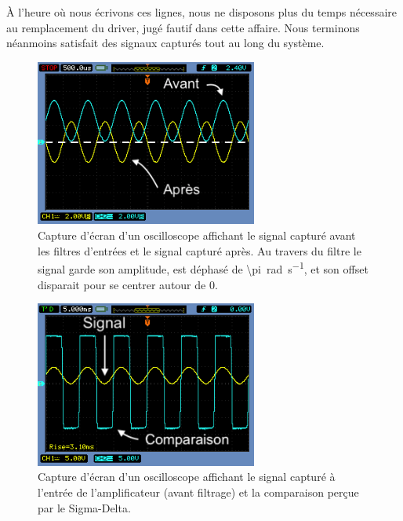 \documentclass[10pt, oneside, a4paper]{article}
\begin{document}
À l'heure où nous écrivons ces lignes, nous ne disposons plus du temps nécessaire au remplacement du driver, jugé fautif dans cette affaire.
Nous terminons néanmoins satisfait des signaux capturés tout au long du système.


\pagebreak
\begin{figure}[p]
	\centering
	\includegraphics[width=0.65\textwidth]{image/osci-post-filters.png}
	\caption{Capture d'écran d'un oscilloscope affichant le signal capturé avant les
			 filtres d'entrées et le signal capturé après.
			 Au travers du filtre le signal garde son amplitude, est déphasé de
			 \SI{\pi}{\radian\per\second}, et son offset disparait pour se centrer autour
			 de 0.}
	\label{fig:osci-post-filters}
\end{figure}

\begin{figure}[p]
	\centering
	\includegraphics[width=0.65\textwidth]{image/osci-compar.png}
	\caption{Capture d'écran d'un oscilloscope affichant le signal capturé à l'entrée
			 de l'amplificateur (avant filtrage) et la comparaison perçue par le
			 Sigma-Delta.}
	\label{fig:osci-compar}
\end{figure}
\end{document}
